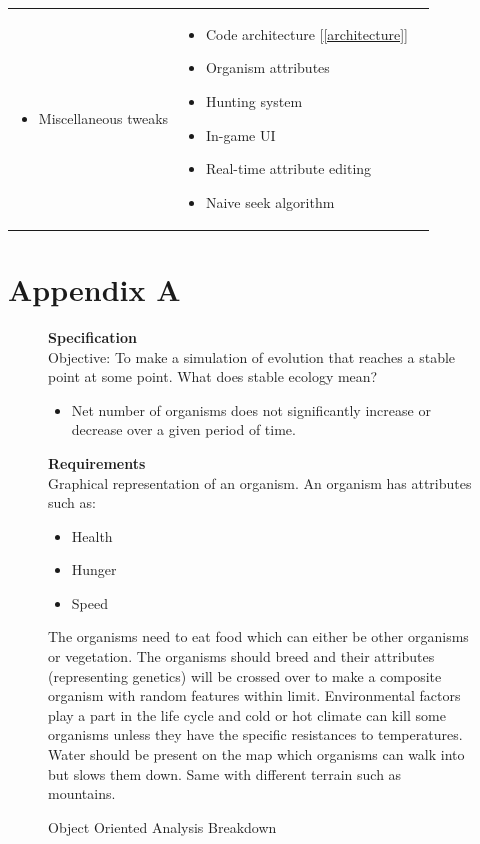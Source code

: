 \documentclass[a4paper, oneside, 11pt]{report}
\begin{document}
{\begin{center}
\begin{tabular}{c|p{}|p{}}
\begin{itemize}
			\item Miscellaneous tweaks
		\end{itemize} & \begin{itemize}
			\itemsep0em
			\item Code architecture [\ref{architecture}]
			\item Organism attributes
			\item Hunting system
			\item In-game UI
			\item Real-time attribute editing
			\item Naive seek algorithm
		\end{itemize} \\
	\end{tabular}
\end{center}
\smallskip
\chapter*{Appendix A}

\begin{figure}[H]
	\caption{Object Oriented Analysis Breakdown}\label{ooa-breakdown}
	
	\textbf{Specification} \\
	Objective: To make a simulation of evolution that reaches a stable point at some point.
	What does stable ecology mean? 
	\begin{itemize}
		\item Net number of organisms does not significantly increase or decrease over a given period of time.
	\end{itemize}
	\textbf{Requirements} \\
	Graphical representation of an organism.
	An organism has attributes such as:
	\begin{itemize}
		\item Health 
		\item Hunger 
		\item Speed
	\end{itemize}
	The organisms need to eat food which can either be other organisms or vegetation. 
	The organisms should breed and their attributes (representing genetics) will be crossed over to make a composite organism with random features within limit. 
	Environmental factors play a part in the life cycle and cold or hot climate can kill some organisms unless they have the specific resistances to temperatures. 
	Water should be present on the map which organisms can walk into but slows them down. Same with different terrain such as mountains. 
	

\end{figure}}
\end{document}
